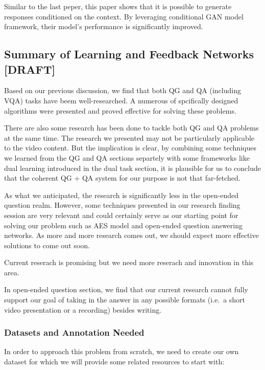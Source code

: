 \documentclass[]{book}
\theoremstyle{definition}
\theoremstyle{definition}
\theoremstyle{definition}
\theoremstyle{remark}
\begin{document}
Similar to the last peper, this paper shows that it is possible to
generate responses conditioned on the context. By leveraging conditional
GAN model framework, their model's performance is significantly
improved.

\subsection{Summary of Learning and Feedback Networks
{[}DRAFT{]}}\label{summary-of-learning-and-feedback-networks-draft}

Based on our previous discussion, we find that both QG and QA (including
VQA) tasks have beem well-researched. A numerous of spcifically designed
algorithms were presented and proved effective for solving these
problems.

There are also some research has been done to tackle both QG and QA
problems at the same time. The research we presented may not be
particularly applicable to the video content. But the implication is
clear, by combining some techniques we learned from the QG and QA
sections separtely with some frameworks like dual learning introduced in
the dual task section, it is plausible for us to conclude that the
coherent QG + QA system for our purpose is not that far-fetched.

As what we anticipated, the research is significantly less in the
open-ended question realm. However, some techniques presented in our
research finding session are very relevant and could certainly serve as
our starting point for solving our problem such as AES model and
open-ended question answering networks. As more and more research comes
out, we should expect more effective solutions to come out soon.

Current reserach is promising but we need more reserach and innovation
in this area.

In open-ended question section, we find that our current research cannot
fully support our goal of taking in the answer in any possible formats
(i.e.~a short video presentation or a recording) besides writing.

\subsubsection{Datasets and Annotation
Needed}\label{datasets-and-annotation-needed}

In order to approach this problem from scratch, we need to create our
own dataset for which we will provide some related resources to start
with:
\end{document}
